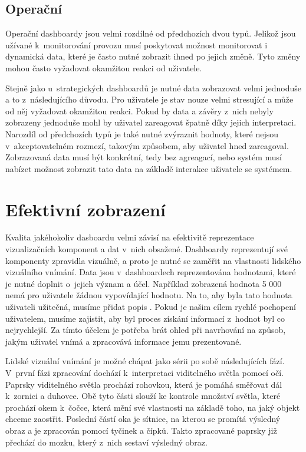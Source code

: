 \subsection{Operační}
Operační dashboardy jsou velmi rozdílné od předchozích dvou typů. Jelikož jsou užívané k~monitorování provozu musí poskytovat možnost monitorovat i dynamická data, které je často nutné zobrazit ihned po jejich změně. Tyto změny mohou často vyžadovat okamžitou reakci od uživatele. 

Stejně jako u~strategických dashboardů je nutné data zobrazovat velmi jednoduše a to z~následujícího důvodu. Pro uživatele je stav nouze velmi stresující a může od něj vyžadovat okamžitou reakci. Pokud by data a závěry z~nich nebyly zobrazeny jednoduše mohl by uživatel zareagovat špatně díky jejich interpretaci. Narozdíl od předchozích typů je také nutné zvýraznit hodnoty, které nejsou v~akceptovatelném rozmezí, takovým způsobem, aby uživatel hned zareagoval. Zobrazovaná data musí být konkrétní, tedy bez agreagací, nebo systém musí nabízet možnost zobrazit tato data na základě interakce uživatele se systémem.

\section{Efektivní zobrazení}
Kvalita jakéhokoliv dasboardu velmi závisí na efektivitě reprezentace vizualizačních komponent a dat v~nich obsažené. Dashboardy reprezentují své komponenty zpravidla vizuálně, a proto je nutné se zaměřit na vlastnosti lidského vizuálního vnímání. Data jsou v~dashboardech reprezentována hodnotami, které je nutné doplnit o~jejich význam a účel. Například zobrazená hodnota 5 000 nemá pro uživatele žádnou vypovídající hodnotu. Na to, aby byla tato hodnota uživateli užitečná, musíme přidat popis . Pokud je našim cílem rychlé pochopení uživatelem, musíme zajistit, aby byl proces získání informací z~hodnot byl co nejrychlejší. Za tímto účelem je potřeba brát ohled při navrhování na způsob, jakým uživatel vnímá a zpracovává informace jemu prezentované.

Lidské vizuální vnímání \cite{baluch_gonzales_2015} je možné chápat jako sérii po sobě následujících fází. V~první fázi zpracování dochází k~interpretaci viditelného světla pomocí očí. Paprsky viditelného světla prochází rohovkou, která je pomáhá směřovat dál k~zornici a duhovce. Obě tyto části slouží ke kontrole množství světla, které prochází okem k~čočce, která mění své vlastnosti na základě toho, na jaký objekt chceme zaostřit. Poslední částí oka je sítnice, na kterou se promítá výsledný obraz a je zpracován pomocí tyčinek a čípků. Takto zpracované paprsky již přechází do mozku, který z~nich sestaví výsledný obraz.

